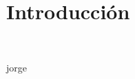 \section{Introducción} 
\textbf{}\\
\begin{flushleft}


\begin{itemize}

jorge


	


\end{itemize} 


\end{flushleft}